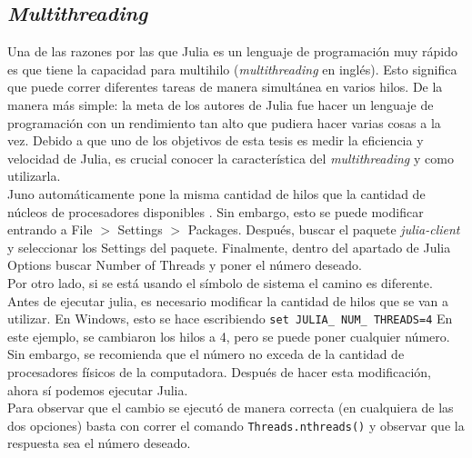 \subsection{\textit{Multithreading}}
Una de las razones por las que Julia es un lenguaje de programación muy rápido es que tiene la capacidad para multihilo (\textit{multithreading} en inglés). Esto significa que puede correr diferentes tareas de manera simultánea en varios hilos. De la manera más simple: la meta de los autores de Julia fue hacer un lenguaje de programación con un rendimiento tan alto que pudiera hacer varias cosas a la vez. Debido a que uno de los objetivos de esta tesis es medir la eficiencia y velocidad de Julia, es crucial conocer la característica del \textit{multithreading} y como utilizarla. 
\\
Juno automáticamente pone la misma cantidad de hilos que la cantidad de núcleos de procesadores disponibles \citep{multithreading-julia}. Sin embargo, esto se puede modificar entrando a \textsf{File} $>$ \textsf{Settings} $>$ \textsf{Packages}. Después, buscar el paquete \textit{julia-client} y seleccionar los \textsf{Settings} del paquete. Finalmente, dentro del apartado de \textsf{Julia Options} buscar \textsf{Number of Threads} y poner el número deseado. 
\\
Por otro lado, si se está usando el símbolo de sistema el camino es diferente. Antes de ejecutar julia, es necesario modificar la cantidad de hilos que se van a utilizar. En Windows, esto se hace escribiendo \texttt{set JULIA\_ NUM\_ THREADS=4} \citep{Julia_manual} En este ejemplo, se cambiaron los hilos a 4, pero se puede poner cualquier número. Sin embargo, se recomienda que el número no exceda de la cantidad de procesadores físicos de la computadora. Después de hacer esta modificación, ahora sí podemos ejecutar Julia. 
\\
Para observar que el cambio se ejecutó de manera correcta (en cualquiera de las dos opciones) basta con correr el comando \texttt{Threads.nthreads()} y observar que la respuesta sea el número deseado. 

